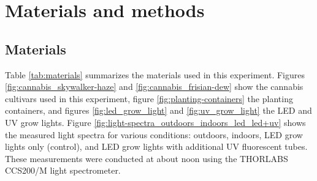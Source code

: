 \section{Materials and methods}

\subsection{Materials}

Table \ref{tab:materials} summarizes the materials used in this experiment. Figures \ref{fig:cannabis_skywalker-haze} and \ref{fig:cannabis_frisian-dew} show the cannabis cultivars used in this experiment, figure \ref{fig:planting-containers} the planting containers, and figures \ref{fig:led_grow_light} and \ref{fig:uv_grow_light} the LED and UV grow lights. Figure \ref{fig:light-spectra_outdoors_indoors_led_led+uv} shows the measured light spectra for various conditions: outdoors, indoors, LED grow lights only (control), and LED grow lights with additional UV fluorescent tubes. These measurements were conducted at about noon using the THORLABS CCS200/M light spectrometer.

